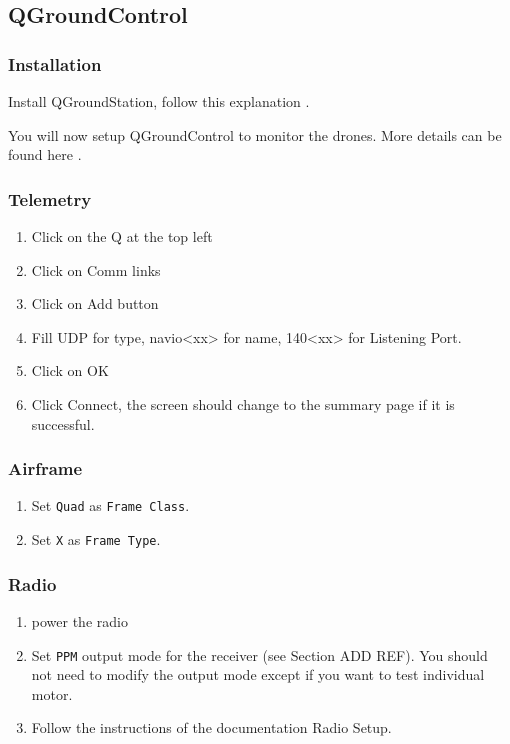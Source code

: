\subsection{QGroundControl}
\subsubsection{Installation}
Install QGroundStation, follow this explanation \cite{qgc_install}.

You will now setup QGroundControl to monitor the drones. More details can be found here \cite{qgc_setup}.

\subsubsection{Telemetry}
\begin{enumerate}
    \item Click on the Q at the top left
    \item Click on Comm links
    \item Click on Add button
    \item Fill UDP for type, navio<xx> for name, 140<xx> for Listening Port.
    \item Click on OK
    \item Click Connect, the screen should change to the summary page if it is successful.
\end{enumerate}

\subsubsection{Airframe}
\begin{enumerate}
    \item Set \texttt{Quad} as \texttt{Frame Class}.
    \item Set \texttt{X} as \texttt{Frame Type}.
\end{enumerate}

\subsubsection{Radio}
\begin{enumerate}
    \item power the radio
    \item Set \texttt{PPM} output mode for the receiver (see Section ADD REF). You should not need to modify the output mode except if you want to test individual motor.
    \item Follow the instructions of the documentation Radio Setup.
\end{enumerate}

